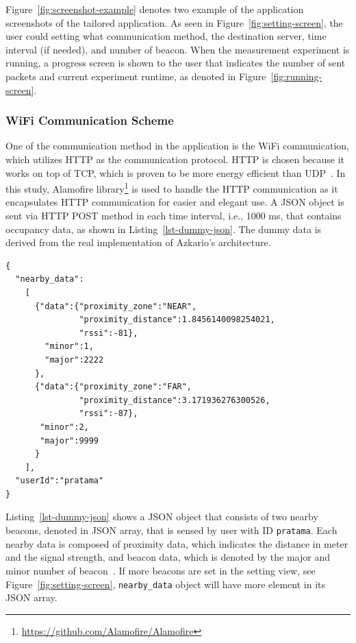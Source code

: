 \documentclass[journal]{vgtc}                %
\begin{document}
Figure~\ref{fig:screenshot-example} denotes two example of the application screenshots of the tailored application. As seen in Figure~\ref{fig:setting-screen}, the user could setting what communication method, the destination server, time interval (if needed), and number of beacon. When the measurement experiment is running, a progress screen is shown to the user that indicates the number of sent packets and current experiment runtime, as denoted in Figure~\ref{fig:running-screen}.

\subsubsection{WiFi Communication Scheme} %
\label{ssub:wifi_communication_scheme}
One of the communication method in the application is the WiFi communication, which utilizes HTTP as the communication protocol. HTTP is chosen because it works on top of TCP, which is proven to be more energy efficient than UDP~\cite{Trestian2012}. In this study, Alamofire library\footnote{\url{https://github.com/Alamofire/Alamofire}} is used to handle the HTTP communication as it encapsulates HTTP communication for easier and elegant use. A JSON object is sent via HTTP POST method in each time interval, i.e., 1000 ms, that contains occupancy data, as shown in Listing~\ref{lst-dummy-json}. The dummy data is derived from the real implementation of Azkario's architecture.

\begin{lstlisting}[caption=Example of dummy occupancy data in JSON., label=lst-dummy-json]
{
  "nearby_data":
    [
      {"data":{"proximity_zone":"NEAR",
               "proximity_distance":1.8456140098254021,
               "rssi":-81},
        "minor":1,
        "major":2222
      },
      {"data":{"proximity_zone":"FAR",
               "proximity_distance":3.171936276300526,
               "rssi":-87},
       "minor":2,
       "major":9999
      }
    ],
  "userId":"pratama"
}
\end{lstlisting}

Listing~\ref{lst-dummy-json} shows a JSON object that consists of two nearby beacons, denoted in JSON array, that is sensed by user with ID \texttt{pratama}. Each nearby data is composed of proximity data, which indicates the distance in meter and the signal strength, and beacon data, which is denoted by the major and minor number of beacon~\cite{AppleInc.2014}. If more beacons are set in the setting view, see Figure~\ref{fig:setting-screen}, \texttt{nearby\_data} object will have more element in its JSON array.
\end{document}
